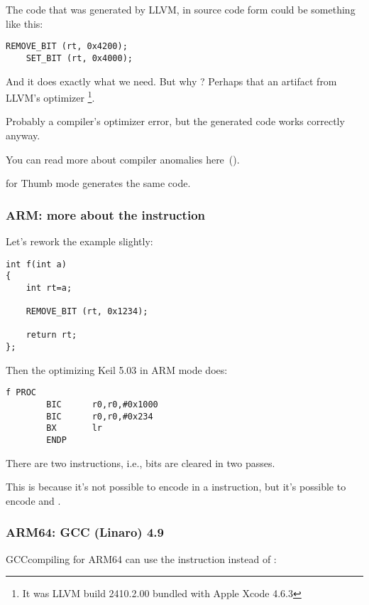 The code that was generated by LLVM, in source code form could be something like this:

\begin{lstlisting}[style=customc]
    REMOVE_BIT (rt, 0x4200);
    SET_BIT (rt, 0x4000);
\end{lstlisting}

And it does exactly what we need. 
But why ? 
Perhaps that an artifact from LLVM's optimizer
\footnote{It was LLVM build 2410.2.00 bundled with Apple Xcode 4.6.3}.

Probably a compiler's optimizer error, but the generated code works correctly anyway.

You can read more about compiler anomalies here~().

\OptimizingXcodeIV for Thumb mode generates the same code.

\subsubsection{ARM: more about the  instruction}

Let's rework the example slightly:

\begin{lstlisting}[style=customc]
int f(int a)
{
    int rt=a;

    REMOVE_BIT (rt, 0x1234);

    return rt;
};
\end{lstlisting}

Then the optimizing Keil 5.03 
in ARM mode does:

\begin{lstlisting}[style=customasmARM]
f PROC
        BIC      r0,r0,#0x1000
        BIC      r0,r0,#0x234
        BX       lr
        ENDP
\end{lstlisting}

There are two  instructions, i.e., bits  are cleared in two passes.

This is because it's not possible to encode  in a  instruction, 
but it's possible to encode  and .

\subsubsection{ARM64: \Optimizing GCC (Linaro) 4.9}

\Optimizing GCCcompiling for ARM64 can use the \AND instruction instead of :

